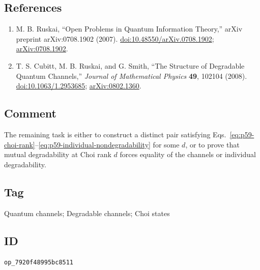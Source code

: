 \subsection*{References}

\begin{enumerate}[label={},leftmargin=4.8em,labelsep=0.5em]
  \footnotesize
  \item[\textup{[Rus07]}]\label{ref:p59-ruskai}
  M. B. Ruskai, ``Open Problems in Quantum Information Theory,''
  arXiv preprint arXiv:0708.1902 (2007).
  \newline
  \href{https://doi.org/10.48550/arXiv.0708.1902}%
       {doi:10.48550/arXiv.0708.1902};
  \href{https://arxiv.org/abs/0708.1902}{arXiv:0708.1902}.

  \item[\textup{[CRS08]}]\label{ref:p59-cubitt-ruskai-smith}
  T. S. Cubitt, M. B. Ruskai, and G. Smith,
  ``The Structure of Degradable Quantum Channels,''
  \emph{Journal of Mathematical Physics} \textbf{49}, 102104 (2008).
  \href{https://doi.org/10.1063/1.2953685}{doi:10.1063/1.2953685};
  \href{https://arxiv.org/abs/0802.1360}{arXiv:0802.1360}.
\end{enumerate}

\subsection*{Comment}

The remaining task is either to construct a distinct pair satisfying
Eqs.~\eqref{eq:p59-choi-rank}--\eqref{eq:p59-individual-nondegradability} for
some $d$, or to prove that mutual degradability at Choi rank $d$ forces
equality of the channels or individual degradability.

\subsection*{Tag}

Quantum channels; Degradable channels; Choi states

\subsection*{ID}

\texttt{op\_7920f48995bc8511}
